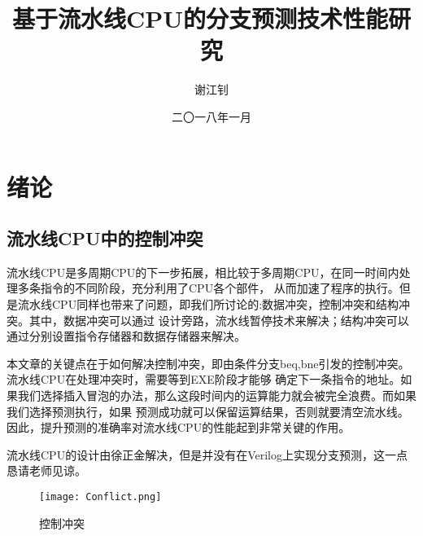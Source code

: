 \documentclass[forprint]{WHUBachelor}
\begin{document}
  
  
  \title{基于流水线CPU的分支预测技术性能研究}
  \author{谢江钊}                            %
  \date{二〇一八年一月}                    %
  
  \maketitle
  \frontmatter
  \tableofcontents
  \mainmatter %
  \chapter{绪论}
  \section{流水线CPU中的控制冲突}
	流水线CPU是多周期CPU的下一步拓展，相比较于多周期CPU，在同一时间内处理多条指令的不同阶段，充分利用了CPU各个部件，
从而加速了程序的执行。但是流水线CPU同样也带来了问题，即我们所讨论的:数据冲突，控制冲突和结构冲突。其中，数据冲突可以通过
设计旁路，流水线暂停技术来解决；结构冲突可以通过分别设置指令存储器和数据存储器来解决。\par
本文章的关键点在于如何解决控制冲突，即由条件分支beq,bne引发的控制冲突。流水线CPU在处理冲突时，需要等到EXE阶段才能够
确定下一条指令的地址。如果我们选择插入冒泡的办法，那么这段时间内的运算能力就会被完全浪费。而如果我们选择预测执行，如果
预测成功就可以保留运算结果，否则就要清空流水线。因此，提升预测的准确率对流水线CPU的性能起到非常关键的作用。\par
	流水线CPU的设计由徐正金解决，但是并没有在Verilog上实现分支预测，这一点恳请老师见谅。
\begin{figure}[ht]
  \centering
    \texttt{[image: Conflict.png]}
    \caption{控制冲突}
    \label{fig:1}
  \end{figure}
\end{document}
